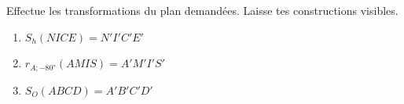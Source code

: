 \documentclass[parskip=half-,twoside=semi, 12pt]{scrartcl}
\begin{document}
\begin{appliquer}[points=6]
    Effectue les transformations du plan demandées. Laisse tes constructions visibles.
    \begin{enumerate}
        \item \(S_{h}(NICE) = N'I'C'E'\)
              \begin{center}
                  
              \end{center}
        \item \(r_{A;\ang{-80}}(AMIS) = A'M'I'S'\)
              \begin{center}
                  
              \end{center}
        \item \(S_{O}(ABCD)=A'B'C'D'\)
              \begin{center}
                  
              \end{center}

    \end{enumerate}
\end{appliquer}
\end{document}
